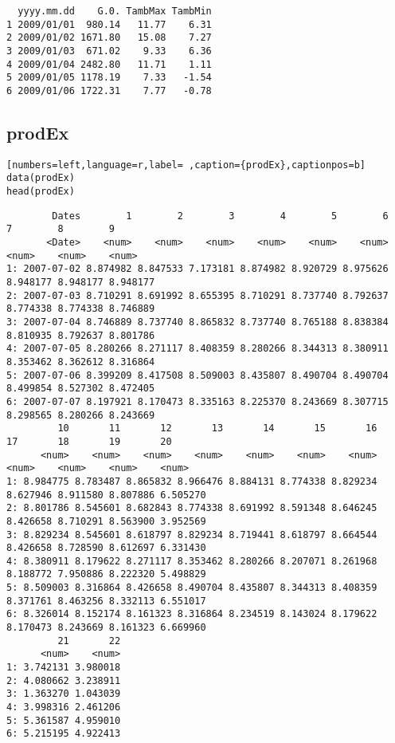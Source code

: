 \begin{verbatim}
  yyyy.mm.dd    G.0. TambMax TambMin
1 2009/01/01  980.14   11.77    6.31
2 2009/01/02 1671.80   15.08    7.27
3 2009/01/03  671.02    9.33    6.36
4 2009/01/04 2482.80   11.71    1.11
5 2009/01/05 1178.19    7.33   -1.54
6 2009/01/06 1722.31    7.77   -0.78
\end{verbatim}

\subsection{prodEx}
\label{sec:org2f1d9c5}
\begin{lstlisting}[numbers=left,language=r,label= ,caption={prodEx},captionpos=b]
data(prodEx)
head(prodEx)
\end{lstlisting}

\begin{verbatim}
        Dates        1        2        3        4        5        6        7        8        9
       <Date>    <num>    <num>    <num>    <num>    <num>    <num>    <num>    <num>    <num>
1: 2007-07-02 8.874982 8.847533 7.173181 8.874982 8.920729 8.975626 8.948177 8.948177 8.948177
2: 2007-07-03 8.710291 8.691992 8.655395 8.710291 8.737740 8.792637 8.774338 8.774338 8.746889
3: 2007-07-04 8.746889 8.737740 8.865832 8.737740 8.765188 8.838384 8.810935 8.792637 8.801786
4: 2007-07-05 8.280266 8.271117 8.408359 8.280266 8.344313 8.380911 8.353462 8.362612 8.316864
5: 2007-07-06 8.399209 8.417508 8.509003 8.435807 8.490704 8.490704 8.499854 8.527302 8.472405
6: 2007-07-07 8.197921 8.170473 8.335163 8.225370 8.243669 8.307715 8.298565 8.280266 8.243669
         10       11       12       13       14       15       16       17       18       19       20
      <num>    <num>    <num>    <num>    <num>    <num>    <num>    <num>    <num>    <num>    <num>
1: 8.984775 8.783487 8.865832 8.966476 8.884131 8.774338 8.829234 8.627946 8.911580 8.807886 6.505270
2: 8.801786 8.545601 8.682843 8.774338 8.691992 8.591348 8.646245 8.426658 8.710291 8.563900 3.952569
3: 8.829234 8.545601 8.618797 8.829234 8.719441 8.618797 8.664544 8.426658 8.728590 8.612697 6.331430
4: 8.380911 8.179622 8.271117 8.353462 8.280266 8.207071 8.261968 8.188772 7.950886 8.222320 5.498829
5: 8.509003 8.316864 8.426658 8.490704 8.435807 8.344313 8.408359 8.371761 8.463256 8.332113 6.551017
6: 8.326014 8.152174 8.161323 8.316864 8.234519 8.143024 8.179622 8.170473 8.243669 8.161323 6.669960
         21       22
      <num>    <num>
1: 3.742131 3.980018
2: 4.080662 3.238911
3: 1.363270 1.043039
4: 3.998316 2.461206
5: 5.361587 4.959010
6: 5.215195 4.922413
\end{verbatim}

